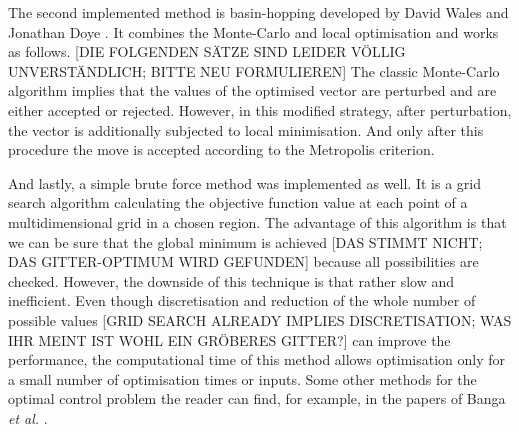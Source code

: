 \documentclass[10pt,A4paper]{article}
\newcommand{\etal}{{\textit{et al. }}}
\begin{document}
The second implemented method is basin-hopping developed by David Wales and Jonathan Doye \cite{walesGlobalOptimizationBasinHopping1997}. 
It combines the Monte-Carlo and local optimisation and works as follows. [DIE FOLGENDEN SÄTZE SIND LEIDER VÖLLIG UNVERSTÄNDLICH; BITTE NEU FORMULIEREN] The classic Monte-Carlo algorithm implies that the values of the optimised vector are perturbed and are either accepted or rejected. 
However, in this modified strategy, after perturbation, the vector is additionally subjected to local minimisation. And only after this procedure the move is accepted according to the Metropolis criterion.
\newline

And lastly, a simple brute force method was implemented as well. 
It is a grid search algorithm calculating the objective function value at each point of a multidimensional grid in a chosen region. 
The advantage of this algorithm is that we can be sure that the global minimum is achieved [DAS STIMMT NICHT; DAS GITTER-OPTIMUM WIRD GEFUNDEN] because all possibilities are checked. 
However, the downside of this technique is that rather slow and inefficient. 
Even though discretisation and reduction of the whole number of possible values [GRID SEARCH ALREADY IMPLIES DISCRETISATION; WAS IHR MEINT IST WOHL EIN GRÖBERES GITTER?] can improve the performance, the computational time of this method allows optimisation only for a small number of optimisation times or inputs. 
Some other methods for the optimal control problem the reader can find, for example, in the papers of Banga \etal \cite{BANGA2005407, bangaImprovingFoodProcessing2003}.
%
\end{document}
